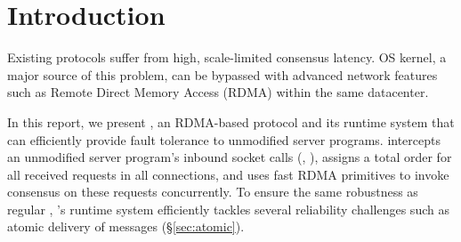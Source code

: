 \section{Introduction} \label{sec:intro}
Existing \paxos protocols suffer from high, scale-limited consensus latency. OS 
kernel, a major source of this problem, can be bypassed with advanced network 
features such as Remote Direct Memory Access (RDMA) within the same datacenter.

In this report, we present \xxx, an RDMA-based \paxos protocol and its runtime 
system that can efficiently provide fault tolerance to unmodified server 
programs. \xxx intercepts an unmodified server program's inbound socket calls 
(\eg, \recv), assigns a total order for all received requests in all 
connections, and uses fast RDMA primitives to invoke consensus on these requests 
concurrently. To ensure the same robustness as regular \paxos, \xxx's runtime 
system efficiently tackles several reliability challenges such as atomic 
delivery of messages (\S\ref{sec:atomic}).